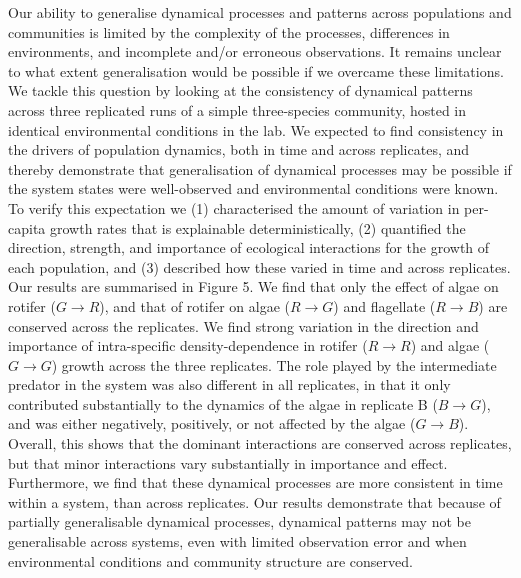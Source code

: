 \documentclass[11pt, oneside]{article}
\begin{document}
Our ability to generalise dynamical processes and patterns across populations and communities is limited by the complexity of the processes, differences in environments, and incomplete and/or erroneous observations. 
It remains unclear to what extent generalisation would be possible if we overcame these limitations.
We tackle this question by looking at the consistency of dynamical patterns across three replicated runs of a simple three-species community, hosted in identical environmental conditions in the lab. 
We expected to find consistency in the drivers of population dynamics, both in time and across replicates, and thereby demonstrate that generalisation of dynamical processes may be possible if the system states were well-observed and environmental conditions were known.
To verify this expectation we (1) characterised the amount of variation in per-capita growth rates that is explainable deterministically, (2) quantified the direction, strength, and importance of ecological interactions for the growth of each population, and (3) described how these varied in time and across replicates.
Our results are summarised in Figure 5.
We find that only the effect of algae on rotifer ($G \rightarrow R$), and that of rotifer on algae ($R \rightarrow G$) and flagellate ($R \rightarrow B$) are conserved across the replicates.
We find strong variation in the direction and importance of intra-specific density-dependence in rotifer ($R \rightarrow R$) and algae ($G \rightarrow G$) growth across the three replicates.
The role played by the intermediate predator in the system was also different in all replicates, in that it only contributed substantially to the dynamics of the algae in replicate B ($B \rightarrow G$), and was either negatively, positively, or not affected by the algae ($G \rightarrow B$).
Overall, this shows that the dominant interactions are conserved across replicates, but that minor interactions vary substantially in importance and effect.
Furthermore, we find that these dynamical processes are more consistent in time within a system, than across replicates.
Our results demonstrate that because of partially generalisable dynamical processes, dynamical patterns may not be generalisable across systems, even with limited observation error and when environmental conditions and community structure are conserved. 
\end{document}
